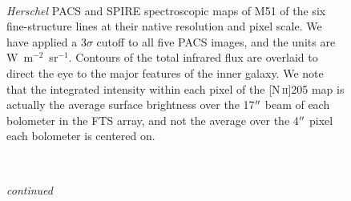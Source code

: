 \begin{figure}[!htbp]
 \\
 \caption[\emph{Herschel} spectroscopic maps of M51 at their native resolution]{\emph{Herschel} PACS and SPIRE spectroscopic maps of M51 of the six fine-structure lines at their native resolution and pixel scale.  We have applied a 3$\sigma$ cutoff to all five PACS images, and the units are W~m$^{-2}$~sr$^{-1}$.  Contours of the total infrared flux are overlaid to direct the eye to the major features of the inner galaxy.  We note that the integrated intensity within each pixel of the [N\,\textsc{ii}]205 map is actually the average surface brightness over the 17$\mbox{$^{\prime\prime}$}$ beam of each bolometer in the FTS array, and not the average over the 4$\mbox{$^{\prime\prime}$}$ pixel each bolometer is centered on.}
\label{fig:pacs_spec_maps3}
\end{figure}
\begin{figure}[!htbp]
\ContinuedFloat
{}\\
\caption[]{\emph{continued}}
\end{figure}
